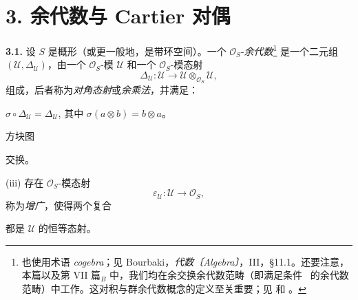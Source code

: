 
\section*{3. 余代数与 Cartier 对偶}
\label{sga3:VIIA:3}

\medskip
\noindent\textbf{3.1.}
\label{sga3:VIIA:3.1}
设 \(S\) 是概形（或更一般地，是带环空间）。一个 \(\mathcal O_S\)-\emph{余代数}\footnote{也使用术语 \emph{cogebra}；见 Bourbaki，\emph{代数〔Algebra〕}，III，\S 11.1。还要注意，本篇以及第 VII 篇\(_B\) 中，我们均在余交换余代数范畴（即满足条件~ 的余代数范畴）中工作。这对积与群余代数概念的定义至关重要；见  和 。}
是一个二元组 \((\mathcal U,\Delta_{\mathcal U})\)，由一个 \(\mathcal O_S\)-模 \(\mathcal U\) 和一个 \(\mathcal O_S\)-模态射
\[
  \Delta_{\mathcal U}:\mathcal U\longrightarrow
  \mathcal U\otimes_{\mathcal O_S}\mathcal U,
\]
组成，后者称为\emph{对角态射}或\emph{余乘法}，并满足：

\smallskip
\noindent
{} \(\sigma\circ\Delta_{\mathcal U}=\Delta_{\mathcal U}\), 其中 \(\sigma(a\otimes b)=b\otimes a\)。

\smallskip
\noindent
{} 方块图
\begin{center}
  \label{sga3:VIIA:3.1-coassociativity-square}
  
\end{center}
交换。

\smallskip
\noindent
(iii) 存在 \(\mathcal O_S\)-模态射
\[
  \varepsilon_{\mathcal U}:\mathcal U\longrightarrow\mathcal O_S,
\]
称为\emph{增广}，使得两个复合
\begin{center}
  \label{sga3:VIIA:3.1-augmentation-sequences}
  
\end{center}
都是 \(\mathcal U\) 的恒等态射。

